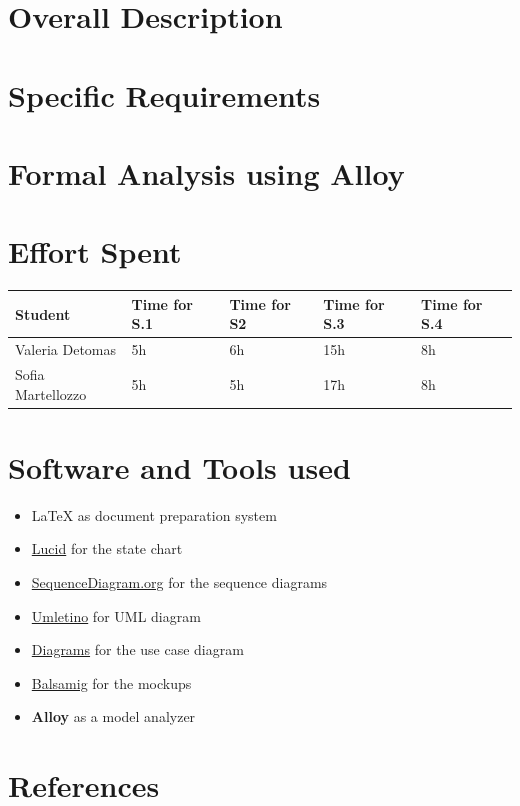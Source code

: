 \documentclass{article}
\begin{document}
\newpage
\section{Overall Description}


\newpage
\section{Specific Requirements}


\newpage
\section{Formal Analysis using Alloy}



\newpage 
\section{Effort Spent}
\begin{table}[h]
      \centering
      \begin{tabular}{|p{3cm}||p{2cm}|p{2cm}|p{2cm}|p{2cm}|}
            \hline
            Student & Time for S.1 & Time for S2 & Time for S.3 & Time for S.4\\
            \hline
            Valeria Detomas & 5h & 6h & 15h & 8h\\
            \hline
            Sofia Martellozzo & 5h & 5h & 17h & 8h\\
            \hline
      \end{tabular}
\end{table}

\section{Software and Tools used}
\begin{itemize}
      \item \LaTeX{} as document preparation system
      \item \href{https://lucid.co/}{Lucid} for the state chart 
      \item \href{https://sequencediagram.org}{SequenceDiagram.org} for the sequence diagrams
      \item \href{http://www.umletino.com/umletino.html}{Umletino} for UML diagram 
      \item \href{https://app.diagrams.net/}{Diagrams} for the use case diagram 
      \item \href{https://balsamiq.com}{Balsamig} for the mockups 
      \item \textbf{Alloy} as a model analyzer
\end{itemize}


\section{References}
\end{document}
